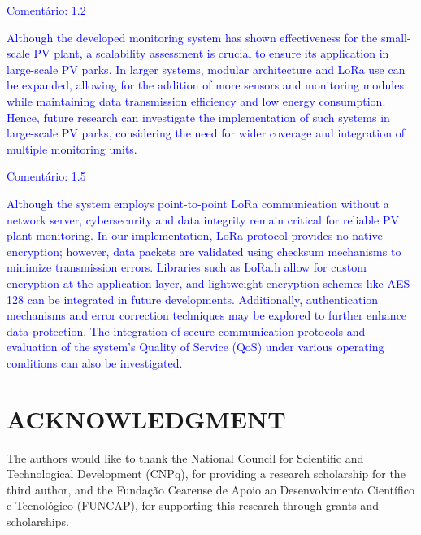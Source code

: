 \documentclass{ieeeaccess}
\begin{document}
\textcolor{blue}{Comentário: 1.2}

\textcolor{blue}{
Although the developed monitoring system has shown effectiveness for the small-scale PV plant, a scalability assessment is crucial to ensure its application in large-scale PV parks. In larger systems, modular architecture and LoRa use can be expanded, allowing for the addition of more sensors and monitoring modules while maintaining data transmission efficiency and low energy consumption. Hence, future research can investigate the implementation of such systems in large-scale PV parks, considering the need for wider coverage and integration of multiple monitoring units.
}

\textcolor{blue}{Comentário: 1.5}


\textcolor{blue}{
Although the system employs point-to-point LoRa communication without a network server, cybersecurity and data integrity remain critical for reliable PV plant monitoring. In our implementation, LoRa protocol provides no native encryption; however, data packets are validated using checksum mechanisms to minimize transmission errors. Libraries such as LoRa.h allow for custom encryption at the application layer, and lightweight encryption schemes like AES-128 can be integrated in future developments. Additionally, authentication mechanisms and error correction techniques may be explored to further enhance data protection. The integration of secure communication protocols and evaluation of the system’s Quality of Service (QoS) under various operating conditions can also be investigated.
}

\section{ACKNOWLEDGMENT}

The authors would like to thank the National Council for Scientific and Technological Development (CNPq), for providing a research scholarship for the third author, and the Fundação Cearense de Apoio ao Desenvolvimento Científico e Tecnológico (FUNCAP), for supporting this research through grants and scholarships.
\end{document}
